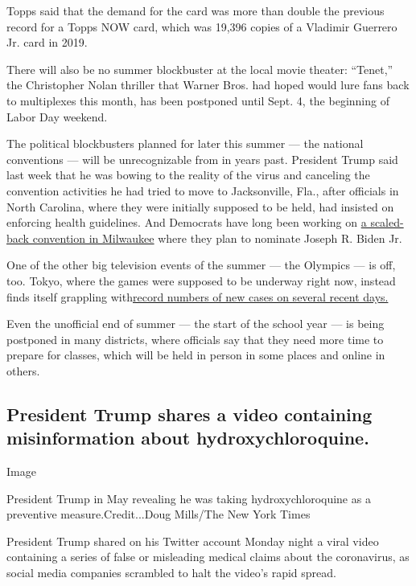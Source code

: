 Topps said that the demand for the card was more than double the
previous record for a Topps NOW card, which was 19,396 copies of a
Vladimir Guerrero Jr. card in 2019.

There will also be no summer blockbuster at the local movie theater:
``Tenet,'' the Christopher Nolan thriller that Warner Bros. had hoped
would lure fans back to multiplexes this month, has been postponed until
Sept. 4, the beginning of Labor Day weekend.

The political blockbusters planned for later this summer --- the
national conventions --- will be unrecognizable from in years past.
President Trump said last week that he was bowing to the reality of the
virus and canceling the convention activities he had tried to move to
Jacksonville, Fla., after officials in North Carolina, where they were
initially supposed to be held, had insisted on enforcing health
guidelines. And Democrats have long been working on
\href{https://www.nytimes.com/2020/07/17/us/politics/democratic-convention-milwaukee.html}{a
scaled-back convention in Milwaukee} where they plan to nominate Joseph
R. Biden Jr.

One of the other big television events of the summer --- the Olympics
--- is off, too. Tokyo, where the games were supposed to be underway
right now, instead finds itself grappling
with\href{https://www.nytimes.com/2020/07/24/world/asia/japan-coronavirus.html}{record
numbers of new cases on several recent days.}

Even the unofficial end of summer --- the start of the school year ---
is being postponed in many districts, where officials say that they need
more time to prepare for classes, which will be held in person in some
places and online in others.

\hypertarget{president-trump-shares-a-video-containing-misinformation-about-hydroxychloroquine}{%
\subsection{President Trump shares a video containing misinformation
about
hydroxychloroquine.}\label{president-trump-shares-a-video-containing-misinformation-about-hydroxychloroquine}}

Image

President Trump in May revealing he was taking hydroxychloroquine as a
preventive measure.Credit...Doug Mills/The New York Times

President Trump shared on his Twitter account Monday night a viral video
containing a series of false or misleading medical claims about the
coronavirus, as social media companies scrambled to halt the video's
rapid spread.

